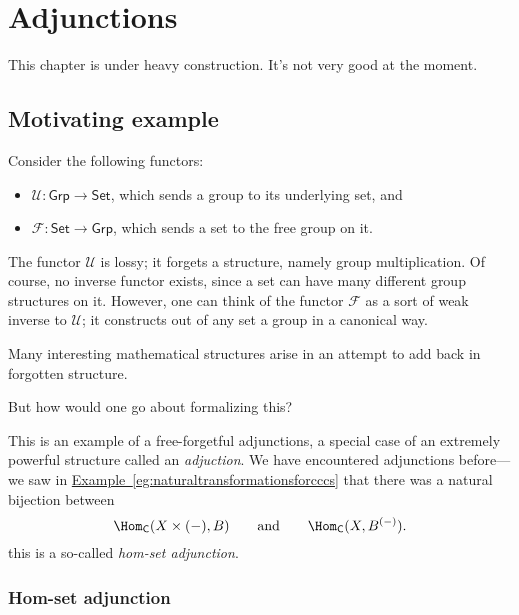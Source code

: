 \documentclass[notes.tex]{subfiles}
\begin{document}
\chapter{Adjunctions}\label{sec:adjunctions}

\begin{note}
  This chapter is under heavy construction. It's not very good at the moment.
\end{note}

\section{Motivating example}
\label{sec:motivating_example}

Consider the following functors:
\begin{itemize}
  \item $\mathcal{U}\colon \mathsf{Grp} \rightarrow \mathsf{Set}$, which sends a group to its underlying set, and

  \item $\mathcal{F}\colon \mathsf{Set} \rightarrow \mathsf{Grp}$, which sends a set to the free group on it.
\end{itemize}

The functor $\mathcal{U}$ is lossy; it forgets a structure, namely group multiplication. Of course, no inverse functor exists, since a set can have many different group structures on it. However, one can think of the functor $\mathcal{F}$ as a sort of weak inverse to $\mathcal{U}$; it constructs out of any set a group in a canonical way.

Many interesting mathematical structures arise in an attempt to add back in forgotten structure.

But how would one go about formalizing this?

This is an example of a free-forgetful adjunctions, a special case of an extremely powerful structure called an \emph{adjuction}. We have encountered adjunctions before---we saw in \hyperref[eg:naturaltransformationsforcccs]{Example~\ref*{eg:naturaltransformationsforcccs}} that there was a natural bijection between
\begin{equation*}
  \Hom_{\mathsf{C}}(X \times (-), B)\qquad\text{and}\qquad \Hom_{\mathsf{C}}(X, B^{(-)}).
\end{equation*}
this is a so-called \emph{hom-set adjunction}.

\subsection{Hom-set adjunction}
\label{ssc:hom_set_adjunction}
\end{document}
